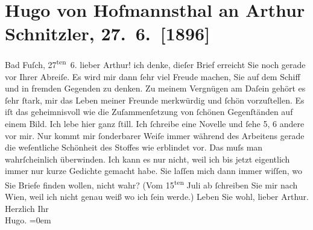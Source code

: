 

         \renewcommand{\erwaehnteOrte}{Orte: Bad Fusch, Wien}
         \renewcommand{\erwaehnteWerke}{Werke: Geschichte der beiden Liebespaare}
               \section[Hugo von Hofmannsthal an Arthur Schnitzler, 27. 6. {[}1896{]}]{ Hugo von Hofmannsthal an Arthur Schnitzler, 27. 6. {[}1896{]}}\nopagebreak{}\rehead{ }\begin{ledgroupsized}[t]{13cm}\normalsize\beginnumbering \toendnotes[C]{\smallbreak\pagebreak[2]} 
\toendnotes[C]{\smallbreak}\pstart
           \raggedleft{}{\pb}Bad Fuſch, 27\textsuperscript{ten} 6.\pend
           \pstart{}lieber Arthur!\pend\pstart
           ich denke, dieſer Brief erreicht Sie noch gerade vor Ihrer Abreiſe. Es wird mir dann
               ſehr viel Freude machen, Sie auf dem Schiff und in fremden Gegenden zu denken. Zu
               meinem Vergnügen am Daſein gehört es ſehr ſtark, mir das Leben meiner Freunde
               merkwürdig und ſchön vorzuſtellen. Es iſt das geheimnis{\pb}voll wie die Zuſammenſetzung von
               ſchönen Gegenſtänden auf einem Bild.\pend
           \pstart
           Ich lebe hier ganz ſtill. Ich ſchreibe eine Novelle und ſehe 5, 6 andere vor mir. Nur kommt mir
               ſonderbarer Weiſe immer während des Arbeitens gerade die weſentliche Schönheit des
               Stoffes wie erblindet vor. Das muſs man wahrſcheinlich überwinden. Ich kann es nur
               nicht, weil ich bis jetzt eigentlich immer nur {\pb}kurze Gedichte gemacht habe.\pend
           \pstart
           Sie laſſen mich dann immer wiſſen, wo Sie Briefe finden wollen, nicht wahr? (Vom
                     15\textsuperscript{ten} Juli ab ſchreiben Sie mir nach
                  Wien, weil ich nicht genau weiß wo ich ſein
               werde.) Leben Sie wohl, lieber Arthur.\pend
           \pstart
           Herzlich Ihr{\\[\baselineskip]}\spacefill\mbox{Hugo.}\pend
           \leftskip=0em{}
         

\end{ledgroupsized}
